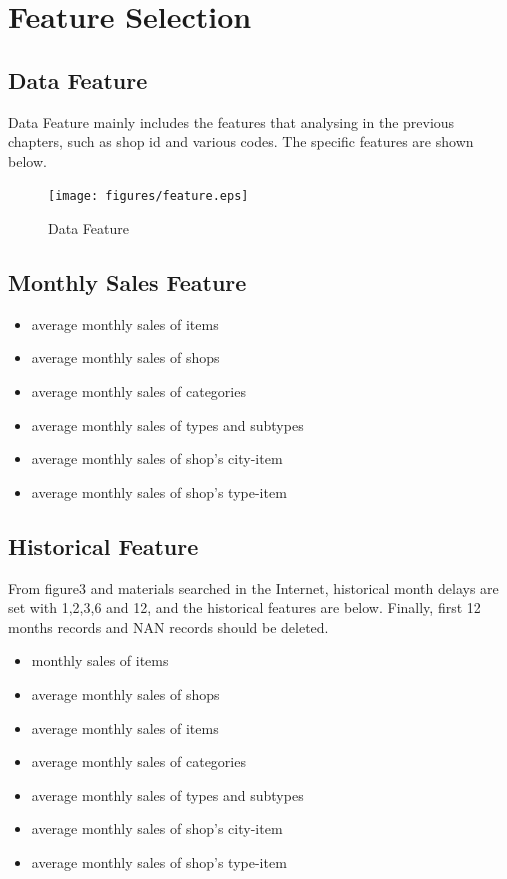 \section{Feature Selection} \label{sec-method}
\subsection{Data Feature}	
Data Feature mainly includes the features that analysing in the previous chapters, such as shop id and various codes. The specific features are shown below.
	\begin{figure}[htb]
	\centering
	\texttt{[image: figures/feature.eps]}
	\caption{Data Feature
	}\label{straddltimeScale}
\end{figure}

\subsection{Monthly Sales Feature}	
\begin{itemize}
	\item average monthly sales of items 
	\item average monthly sales of shops 
	\item average monthly sales of categories
	\item average monthly sales of types and subtypes
	\item average monthly sales of shop's city-item
	\item average monthly sales of shop's type-item
\end{itemize}
\subsection{Historical Feature} From figure3 and materials searched in the Internet, historical month delays are set with 1,2,3,6 and 12, and the historical features are below. Finally, first 12 months records and NAN records should be deleted.
	\begin{itemize}
		\item monthly sales of items 
		\item average monthly sales of shops 
		\item average monthly sales of items
		\item average monthly sales of categories
		\item average monthly sales of types and subtypes
		\item average monthly sales of shop's city-item
		\item average monthly sales of shop's type-item
\end{itemize}
